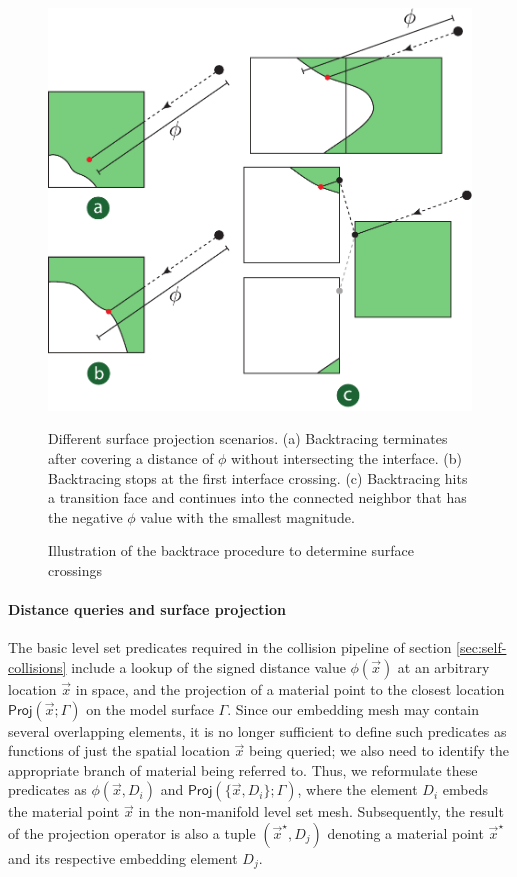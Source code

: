 \begin{figure}
\vspace*{-.2in}
\centering
\includegraphics[width=.88\columnwidth]{chapter_nonmanifoldlevelsets/images/backtrace-cases-alternative-4.pdf}
\vspace*{-.1in}
\caption{Illustration of the backtrace procedure to determine surface crossings}{Different surface projection scenarios. (a) Backtracing terminates after covering a distance of $\phi$ without intersecting the interface. (b) Backtracing stops at the
  first interface crossing. (c) Backtracing hits a transition
  face and continues into the connected neighbor that has the negative $\phi$
  value with the smallest magnitude.}
\label{fig:backtrace}
\end{figure}



\vspace*{-.12in}
\paragraph{Distance queries and surface projection} The basic level
set predicates required in the collision pipeline of section
\ref{sec:self-collisions} include a lookup of the signed distance
value $\phi(\vec{x})$ at an arbitrary location $\vec{x}$ in space, and
the projection of a material point to the closest location
$\textsf{Proj}(\vec{x};\Gamma)$ on the model surface $\Gamma$. Since
our embedding mesh may contain several overlapping elements, it is no
longer sufficient to define such predicates as functions of just the
spatial location $\vec{x}$ being queried; we also need to identify the
appropriate branch of material being referred to. Thus, we reformulate
these predicates as $\phi(\vec{x},D_i)$ and
$\textsf{Proj}(\{\vec{x},D_i\};\Gamma)$, where the element $D_i$
embeds the material point $\vec{x}$ in the non-manifold level set
mesh. Subsequently, the result of the projection operator is also a
tuple $(\vec{x}^\star,D_j)$ denoting a material point $\vec{x}^\star$
and its respective embedding element $D_j$.


